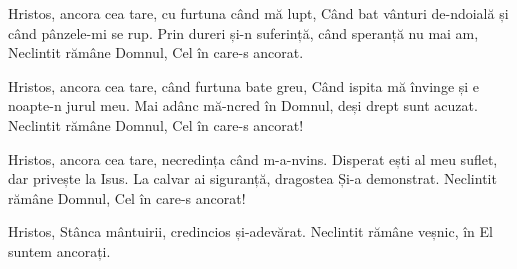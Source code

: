 \beginverse
Hristos, ancora cea tare, cu furtuna când mă lupt,
Când bat vânturi de-ndoială și când pânzele-mi se rup.
Prin dureri și-n suferință, când speranță nu mai am,
Neclintit rămâne Domnul, Cel în care-s ancorat.
\endverse

\beginverse
Hristos, ancora cea tare, când furtuna bate greu,
Când ispita mă învinge și e noapte-n jurul meu.
Mai adânc mă-ncred în Domnul, deși drept sunt acuzat.
Neclintit rămâne Domnul, Cel în care-s ancorat!
\endverse

\beginverse
Hristos, ancora cea tare, necredința când m-a-nvins.
Disperat ești al meu suflet, dar privește la Isus.
La calvar ai siguranță, dragostea Și-a demonstrat.
Neclintit rămâne Domnul, Cel în care-s ancorat!
\endverse

\beginchorus
Hristos, Stânca mântuirii, credincios și-adevărat.
Neclintit rămâne veșnic, în El suntem ancorați.
\endchorus
\endsong